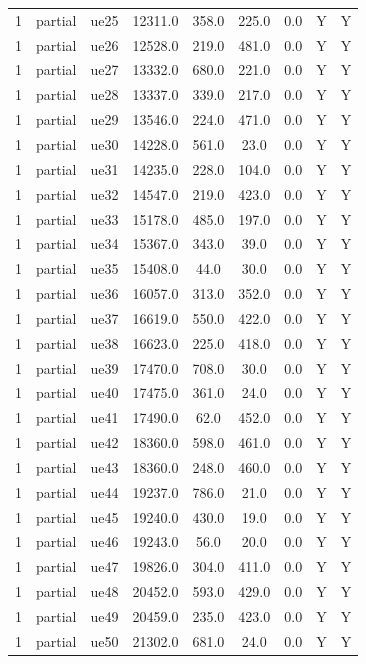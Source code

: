 \begin{table}[ht]
\begin{tabular}{|c|c|c|c|c|c|c|c|c|}
1 & partial & ue25 & 12311.0 & 358.0 & 225.0 & 0.0 & Y & Y \\
1 & partial & ue26 & 12528.0 & 219.0 & 481.0 & 0.0 & Y & Y \\
1 & partial & ue27 & 13332.0 & 680.0 & 221.0 & 0.0 & Y & Y \\
1 & partial & ue28 & 13337.0 & 339.0 & 217.0 & 0.0 & Y & Y \\
1 & partial & ue29 & 13546.0 & 224.0 & 471.0 & 0.0 & Y & Y \\
1 & partial & ue30 & 14228.0 & 561.0 & 23.0 & 0.0 & Y & Y \\
1 & partial & ue31 & 14235.0 & 228.0 & 104.0 & 0.0 & Y & Y \\
1 & partial & ue32 & 14547.0 & 219.0 & 423.0 & 0.0 & Y & Y \\
1 & partial & ue33 & 15178.0 & 485.0 & 197.0 & 0.0 & Y & Y \\
1 & partial & ue34 & 15367.0 & 343.0 & 39.0 & 0.0 & Y & Y \\
1 & partial & ue35 & 15408.0 & 44.0 & 30.0 & 0.0 & Y & Y \\
1 & partial & ue36 & 16057.0 & 313.0 & 352.0 & 0.0 & Y & Y \\
1 & partial & ue37 & 16619.0 & 550.0 & 422.0 & 0.0 & Y & Y \\
1 & partial & ue38 & 16623.0 & 225.0 & 418.0 & 0.0 & Y & Y \\
1 & partial & ue39 & 17470.0 & 708.0 & 30.0 & 0.0 & Y & Y \\
1 & partial & ue40 & 17475.0 & 361.0 & 24.0 & 0.0 & Y & Y \\
1 & partial & ue41 & 17490.0 & 62.0 & 452.0 & 0.0 & Y & Y \\
1 & partial & ue42 & 18360.0 & 598.0 & 461.0 & 0.0 & Y & Y \\
1 & partial & ue43 & 18360.0 & 248.0 & 460.0 & 0.0 & Y & Y \\
1 & partial & ue44 & 19237.0 & 786.0 & 21.0 & 0.0 & Y & Y \\
1 & partial & ue45 & 19240.0 & 430.0 & 19.0 & 0.0 & Y & Y \\
1 & partial & ue46 & 19243.0 & 56.0 & 20.0 & 0.0 & Y & Y \\
1 & partial & ue47 & 19826.0 & 304.0 & 411.0 & 0.0 & Y & Y \\
1 & partial & ue48 & 20452.0 & 593.0 & 429.0 & 0.0 & Y & Y \\
1 & partial & ue49 & 20459.0 & 235.0 & 423.0 & 0.0 & Y & Y \\
1 & partial & ue50 & 21302.0 & 681.0 & 24.0 & 0.0 & Y & Y \\

\end{tabular}
\end{table}
